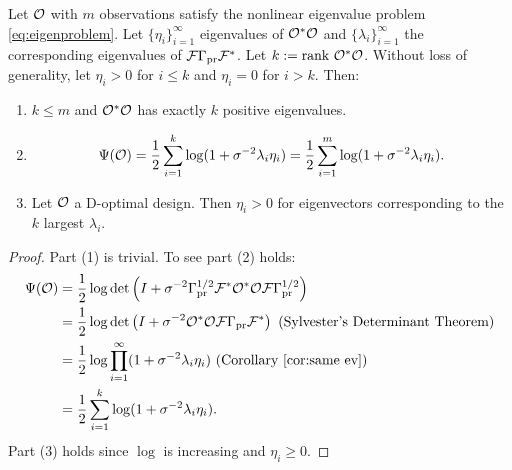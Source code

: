 \begin{corollary}\label{cor:true target}
  Let $\mathcal{O}$ with $m$ observations satisfy the nonlinear eigenvalue
  problem \eqref{eq:eigenproblem}. Let $\{\eta_i\}_{i=1}^{\infty}$
  eigenvalues of $\mathcal{O}^*\mathcal{O}$ and $\{\lambda_i\}_{i=1}^{\infty}$ the
  corresponding eigenvalues of $\mathcal{F} \Gamma_{\textup{pr}} \mathcal{F}^*$. Let $k:=\textup{rank}\ 
  \mathcal{O}^*\mathcal{O}$. Without loss of generality, let $\eta_i > 0$ for $i\leq
  k$ and $\eta_i = 0$ for $i > k$. Then:
  \begin{enumerate}
    \item $k \leq m$ and $\mathcal{O}^*\mathcal{O}$ has exactly $k$ positive
      eigenvalues.
    \item
      \begin{equation*}
        \tar(\obs) = \frac12 \sum_{i=1}^{k} \log (1 + \sigma^{-2}\lambda_i\eta_i) = \frac12 \sum_{i=1}^{m} \log (1 + \sigma^{-2}\lambda_i\eta_i).
      \end{equation*}
    \item Let $\mathcal{O}$ a D-optimal design. Then $\eta_i > 0$ for
      eigenvectors corresponding to the $k$ largest $\lambda_i$.
  \end{enumerate}
\end{corollary}
\begin{proof}
  Part (1) is trivial. To see part (2) holds: 
  \begin{align}
    \begin{split}
      \tar(\obs) &= \frac12\log \det \left (I + \sigma^{-2} \prcov^{1/2} \fwd ^* \obs^*
      \obs \fwd \prcov^{1/2}\right )\\%
      &= \frac12 \log \det \left (I + \sigma^{-2} \obs^* \obs \fwd
      \prcov\fwd^* \right ) \text{ (Sylvester's Determinant
      Theorem)}\\
      &=\frac12 \log \prod_{i=1}^{\infty} ( 1 + \sigma^{-2} \lambda_i\eta_i ) \text{ (Corollary \ref{cor:same ev})} \\
      &=\frac12 \sum_{i=1}^{k} \log (1 + \sigma^{-2}\lambda_i\eta_i). 
    \end{split}
  \end{align}
  Part (3) holds since $\log$ is increasing and $\eta_i \geq 0$.
\end{proof}


